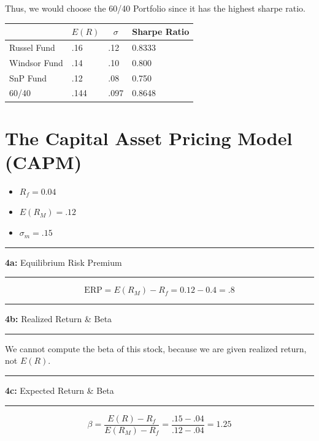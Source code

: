 \documentclass[11pt]{article}
\newcommand\question[2]{\vspace{.25in}\hrule\textbf{#1: } #2\vspace{.5em}\hrule\vspace{.10in}}
\begin{document}
Thus, we would choose the 60/40 Portfolio since it has the highest sharpe ratio.
\begin{table}[h]
    \begin{center}
        \begin{tabular}[c]{l|l|l|l}
            \hline
            \multicolumn{1}{c|}{\textbf{  }} & 
            \multicolumn{1}{c|}{\textbf{$E(R)$}} &
            \multicolumn{1}{c|}{\textbf{$\sigma$}} &
            \multicolumn{1}{c}{Sharpe Ratio} \\
            \hline
            Russel Fund & .16 & .12 & 0.8333\\
            Windsor Fund & .14 & .10 & 0.800\\
            SnP Fund & .12 & .08 & 0.750\\
            60/40 & .144 & .097 & 0.8648\\
            \hline
        \end{tabular}
    \end{center}
\end{table}


\pagebreak
\section{The Capital Asset Pricing Model (CAPM)}
\begin{itemize}
    \item $R_f = 0.04$
    \item $E(R_M) = .12$
    \item $\sigma_m = .15$
\end{itemize}
\question{4a}{Equilibrium Risk Premium} 
\[
    \text{ERP} = E(R_M) - R_f = 0.12 - 0.4 = .8
\]

\question{4b}{Realized Return \& Beta} 
We cannot compute the beta of this stock, because we are given realized return, not $E(R)$.

\question{4c}{Expected Return \& Beta} 
\[
    \beta = \frac{E(R)-R_f}{E(R_M)-R_f} = \frac{.15-.04}{.12-.04} = 1.25
\]
\end{document}
